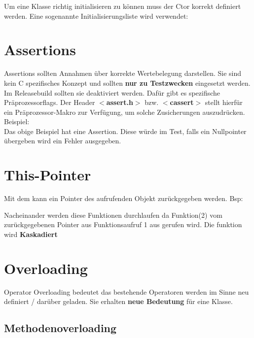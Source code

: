 Um eine Klasse richtig initialisieren zu können muss der Ctor korrekt definiert werden. 
Eine sogenannte Initialisierungsliste wird verwendet:



\section{Assertions}

Assertions sollten Annahmen über korrekte Wertebelegung darstellen. 
Sie sind kein C spezifisches Konzept und sollten \textbf{nur zu Testzwecken} eingesetzt werden. 
Im Releasebuild sollten sie deaktiviert werden. 
Dafür gibt es spezifische Präprozessorflags.
Der Header \textbf{$<$assert.h$>$} bzw. \textbf{$<$cassert$>$} stellt hierfür ein Präprozessor-Makro  zur Verfügung, um solche Zusicherungen auszudrücken.\\
Beispiel:\\



Das obige Beispiel hat eine Assertion. 
Diese würde im Test, falls ein Nullpointer übergeben wird ein Fehler ausgegeben. 

\section{This-Pointer}

Mit dem  kann ein Pointer des aufrufenden Objekt zurückgegeben werden. Bsp:



Nacheinander werden diese Funktionen durchlaufen da Funktion(2) vom zurückgegebenen Pointer aus Funktionsaufruf 1 aus gerufen wird.
Die funktion wird \textbf{Kaskadiert}


\section{Overloading}

Operator Overloading bedeutet das bestehende Operatoren  werden im Sinne neu definiert / darüber geladen. 
Sie erhalten \textbf{neue Bedeutung} für eine Klasse.


\subsection{Methodenoverloading}

